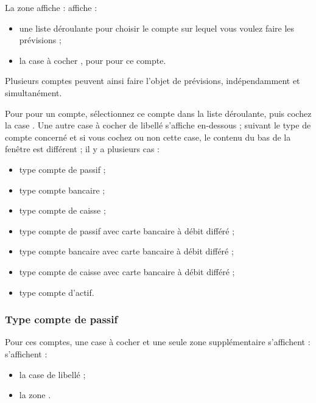 La zone  \ifIllustration affiche :
\else affiche : 
\fi

\begin{itemize}
	\item une liste déroulante pour choisir le compte sur lequel vous voulez faire les prévisions ;
	\item la case à cocher , pour  pour ce compte.
\end{itemize}

Plusieurs comptes peuvent ainsi faire l'objet de prévisions, indépendamment et simultanément. 

Pour  pour un compte, sélectionnez ce compte dans la liste déroulante, puis cochez la case . Une autre case à cocher de libellé  s'affiche en-dessous ; suivant le type de compte concerné et si vous cochez ou non cette case, le contenu du bas de la fenêtre est différent ; il y a plusieurs cas :

\begin{itemize}
	\item type compte de passif ;
	\item type compte bancaire ;
	\item type compte de caisse ;		
	\item type compte de passif avec carte bancaire à débit différé ;	
	\item type compte bancaire avec carte bancaire à débit différé ;
	\item type compte de caisse avec carte bancaire à débit différé ;
	\item type compte d'actif.	
\end{itemize}		


\subsubsection{Type compte de passif\label{setup-budget-data-liability}}

Pour ces comptes, une case à cocher et une seule zone supplémentaire \ifIllustration s'affichent :
\else s'affichent :
\fi

\begin{itemize}
	\item la case de libellé  ; 
	\item la zone .
\end{itemize}


